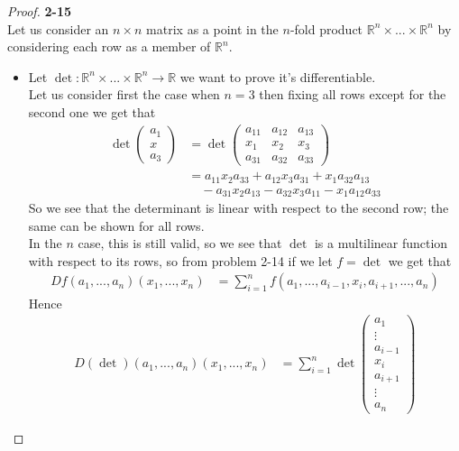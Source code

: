 \documentclass[11pt]{article}
\newcommand{\R}{\mathbb{R}}
\theoremstyle{definition}
\begin{document}
\cleardoublepage
\begin{proof}{\textbf{2-15}}\\
Let us consider an $n \times n$ matrix as a point in the $n$-fold product
$\R^n \times ... \times \R^n$ by considering each row as a member of $\R^n$.
\begin{itemize}
    \item [(a)] Let $\det: \R^n \times ... \times \R^n \to \R$ we want to
    prove it's differentiable.
    \\
    Let us consider first the case when $n = 3$ then fixing all rows except for
    the second one we get that
    \begin{align*}
        \det\begin{pmatrix}
            a_1\\ x \\ a_3
        \end{pmatrix}
        &= \det\begin{pmatrix}
            a_{11} & a_{12} & a_{13} \\ x_1 & x_2 & x_3 \\ a_{31} & a_{32} & a_{33}
        \end{pmatrix}\\
        &= a_{11}x_2a_{33} + a_{12}x_3a_{31} + x_1a_{32}a_{13}\\
        &\quad- a_{31}x_2a_{13} - a_{32}x_3a_{11} - x_1a_{12}a_{33}
    \end{align*}
    So we see that the determinant is linear with respect to the second row;
    the same can be shown for all rows.
    \\
    In the $n$ case, this is still valid, so we see that $\det$ is a
    multilinear function with respect to its rows, so from problem 2-14 if we
    let $f = \det$ we get that
    \begin{align*}
        Df(a_1, ..., a_n)(x_1, ..., x_n)
        &= \sum_{i=1}^n f(a_1, ..., a_{i-1}, x_i, a_{i+1}, ..., a_n)
    \end{align*}
    Hence
    \begin{align*}
        D(\det)(a_1, ..., a_n)(x_1, ..., x_n)
        &= \sum_{i=1}^n \det\begin{pmatrix}
            a_1\\ \vdots \\ a_{i-1} \\ x_i \\ a_{i+1} \\ \vdots \\ a_n
        \end{pmatrix}

\end{align*}
\end{itemize}
\end{proof}
\end{document}
